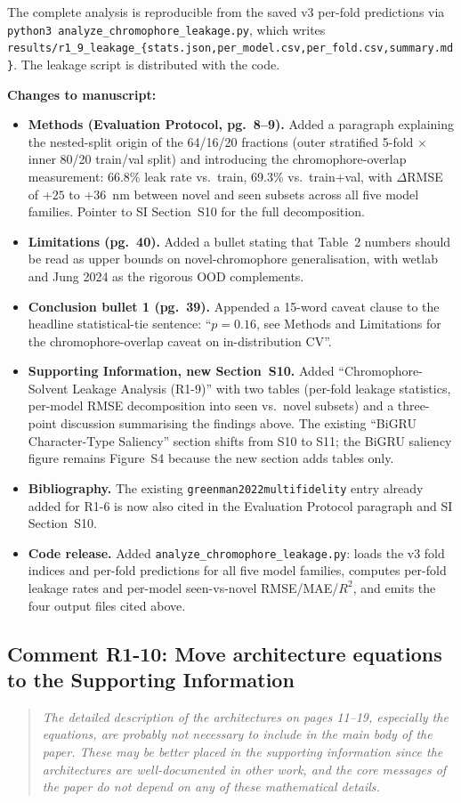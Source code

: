 \documentclass[11pt]{article}
\newenvironment{reviewer}{%
  \begin{quote}\itshape\color{black!70}}{%
  \end{quote}}
\newenvironment{changes}{%
  \noindent\textbf{Changes to manuscript:}
  \begin{itemize}[leftmargin=2em,itemsep=2pt]}{%
  \end{itemize}\medskip}
\begin{document}
{The complete analysis is reproducible from the saved v3 per-fold predictions via \texttt{python3 analyze\_chromophore\_leakage.py}, which writes \texttt{results/r1\_9\_leakage\_\{stats.json,per\_model.csv,per\_fold.csv,summary.md\}}. The leakage script is distributed with the code.}

\begin{changes}
  \item \textbf{Methods (Evaluation Protocol, pg.\ 8--9).} Added a paragraph explaining the nested-split origin of the 64/16/20 fractions (outer stratified 5-fold $\times$ inner 80/20 train/val split) and introducing the chromophore-overlap measurement: 66.8\% leak rate vs.\ train, 69.3\% vs.\ train+val, with $\Delta$RMSE of $+25$ to $+36$~nm between novel and seen subsets across all five model families. Pointer to SI Section~S10 for the full decomposition.
  \item \textbf{Limitations (pg.\ 40).} Added a bullet stating that Table~2 numbers should be read as upper bounds on novel-chromophore generalisation, with wetlab and Jung 2024 as the rigorous OOD complements.
  \item \textbf{Conclusion bullet 1 (pg.\ 39).} Appended a 15-word caveat clause to the headline statistical-tie sentence: ``$p = 0.16$, see Methods and Limitations for the chromophore-overlap caveat on in-distribution CV''.
  \item \textbf{Supporting Information, new Section~S10.} Added ``Chromophore-Solvent Leakage Analysis (R1-9)'' with two tables (per-fold leakage statistics, per-model RMSE decomposition into seen vs.\ novel subsets) and a three-point discussion summarising the findings above. The existing ``BiGRU Character-Type Saliency'' section shifts from S10 to S11; the BiGRU saliency figure remains Figure~S4 because the new section adds tables only.
  \item \textbf{Bibliography.} The existing \texttt{greenman2022multifidelity} entry already added for R1-6 is now also cited in the Evaluation Protocol paragraph and SI Section~S10.
  \item \textbf{Code release.} Added \texttt{analyze\_chromophore\_leakage.py}: loads the v3 fold indices and per-fold predictions for all five model families, computes per-fold leakage rates and per-model seen-vs-novel RMSE/MAE/$R^2$, and emits the four output files cited above.
\end{changes}

\subsection*{Comment R1-10: Move architecture equations to the Supporting Information}
\begin{reviewer}
The detailed description of the architectures on pages 11--19, especially the equations, are probably not necessary to include in the main body of the paper. These may be better placed in the supporting information since the architectures are well-documented in other work, and the core messages of the paper do not depend on any of these mathematical details.
\end{reviewer}
\end{document}
